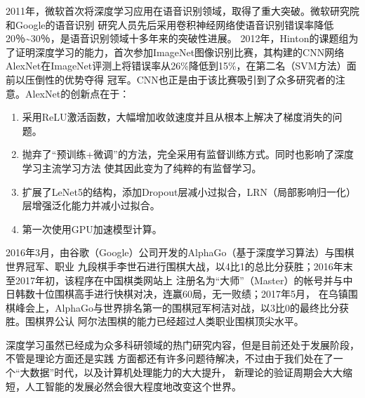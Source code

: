   2011年，微软首次将深度学习应用在语音识别领域，取得了重大突破。微软研究院和Google的语音识别
  研究人员先后采用卷积神经网络使语音识别错误率降低20％\textasciitilde30％，是语音识别领域十多年来的突破性进展。
  2012年，Hinton的课题组为了证明深度学习的能力，首次参加ImageNet图像识别比赛，其构建的CNN网络
  AlexNet在ImageNet评测上将错误率从26\%降低到15\%，在第二名（SVM方法）面前以压倒性的优势夺得
  冠军。CNN也正是由于该比赛吸引到了众多研究者的注意。AlexNet的创新点在于：

  \begin{enumerate}[(1)]
    \dawu\item 采用ReLU激活函数，大幅增加收敛速度并且从根本上解决了梯度消失的问题。
    \dawu\item 抛弃了“预训练+微调”的方法，完全采用有监督训练方式。同时也影响了深度学习主流学习方法
      使其因此变为了纯粹的有监督学习。
    \dawu\item 扩展了LeNet5的结构，添加Dropout层减小过拟合，LRN（局部影响归一化）层增强泛化能力并减小过拟合。
    \dawu\item 第一次使用GPU加速模型计算。
  \end{enumerate}

  2016年3月，由谷歌（Google）公司开发的AlphaGo（基于深度学习算法）与围棋世界冠军、职业
  九段棋手李世石进行围棋大战，以4比1的总比分获胜；2016年末至2017年初，该程序在中国棋类网站上
  注册名为“大师”（Master）的帐号并与中日韩数十位围棋高手进行快棋对决，连赢60局，无一败绩；2017年5月，
  在乌镇围棋峰会上，AlphaGo与世界排名第一的围棋冠军柯洁对战，以3比0的最终比分获胜。围棋界公认
  阿尔法围棋的能力已经超过人类职业围棋顶尖水平。

  深度学习虽然已经成为众多科研领域的热门研究内容，但是目前还处于发展阶段，不管是理论方面还是实践
  方面都还有许多问题待解决，不过由于我们处在了一个“大数据”时代，以及计算机处理能力的大大提升，
  新理论的验证周期会大大缩短，人工智能的发展必然会很大程度地改变这个世界。
